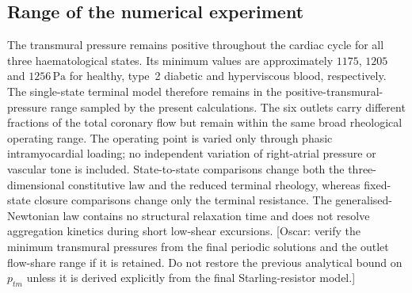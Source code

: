 \documentclass[lineno]{jfm}
\begin{document}
\subsection{Range of the numerical experiment}
\label{sec:results-consistency}
The transmural pressure remains positive throughout the cardiac cycle for all
three haematological states. Its minimum values are approximately
$1175$, $1205$ and $1256\,\mathrm{Pa}$ for healthy, type~2 diabetic and
hyperviscous blood, respectively. The single-state terminal model therefore
remains in the positive-transmural-pressure range sampled by the present
calculations.
The six outlets carry different fractions of the total coronary flow but
remain within the same broad rheological operating range.
The operating point is varied only through phasic intramyocardial loading; no
independent variation of right-atrial pressure or vascular tone is included.
State-to-state comparisons change both the three-dimensional constitutive law
and the reduced terminal rheology, whereas fixed-state closure comparisons
change only the terminal resistance. The generalised-Newtonian law contains no
structural relaxation time and does not resolve aggregation kinetics during
short low-shear excursions.
{\color{red}[Oscar: verify the minimum transmural pressures from the final
periodic solutions and the outlet flow-share range if it is retained. Do not
restore the previous analytical bound on $p_{tm}$ unless it is derived
explicitly from the final Starling-resistor model.]}
\end{document}

